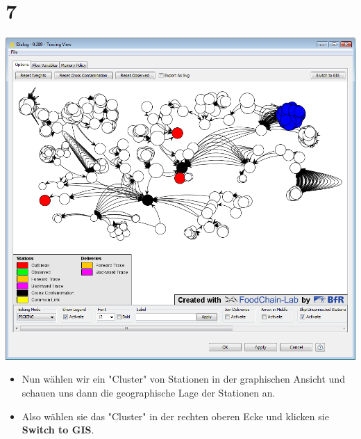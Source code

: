 \documentclass{beamer}
\begin{document}
\section{7}
\begin{frame}
	\begin{center}
  		\includegraphics[height=0.6\textheight]{7.png}
	\end{center}
	\begin{itemize}
		\item Nun wählen wir ein "Cluster" von Stationen in der graphischen Ansicht und schauen uns dann die geographische Lage der Stationen an.
		\item Also wählen sie das "Cluster" in der rechten oberen Ecke und klicken sie \textbf{Switch to GIS}.
	\end{itemize}
\end{frame}
\end{document}
